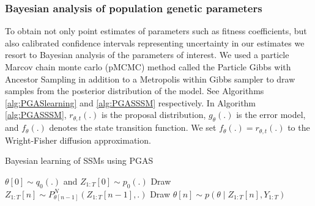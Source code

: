 \documentclass{article}
\begin{document}
\subsubsection{Bayesian analysis of population genetic parameters}
To obtain not only point estimates of parameters such as fitness coefficients, but also calibrated confidence intervals representing uncertainty in our estimates we resort to Bayesian analysis of the parameters of interest.
We used a particle Marcov chain monte carlo (pMCMC) method called the Particle Gibbs with Ancestor Sampling \cite{lindsten2014particle} in addition to a Metropolis within Gibbs sampler to draw samples from the posterior distribution of the model.
See Algorithms \ref{alg:PGASlearning} and \ref{alg:PGASSSM} respectively. 
In Algorithm \ref{alg:PGASSSM}, $r_{\theta, t}(.)$ is the proposal distribution,
$g_{\theta}(.)$ is the error model, and $f_{\theta}(.)$ denotes the state transition function.
We set $f_{\theta}(.) = r_{\theta, t}(.)$ to the Wright-Fisher diffusion approximation.

\begin{algorithm}
\caption{Bayesian learning of SSMs using PGAS} \label{alg:PGASlearning}
\begin{algorithmic}[1]
\State $\theta[0] \sim q_0(.)$ and $Z_{1:T}[0] \sim p_0(.)$
\State Draw $Z_{1:T}[n] \sim P_{\theta[n-1]}^N(Z_{1:T}[n-1], .)$
\State Draw $\theta[n] \sim p(\theta \mid Z_{1:T}[n], Y_{1:T}) $
\EndFor
\EndProcedure
\end{algorithmic}
\end{algorithm}
\end{document}
